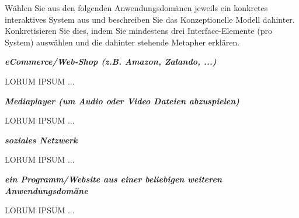 \documentclass[a4paper,10pt]{article}
\begin{document}
\kopf
\renewcommand{\figurename}{Figure}

Wählen Sie aus den folgenden Anwendungsdomänen jeweils ein konkretes interaktives System aus und beschreiben Sie das Konzeptionelle Modell dahinter. Konkretisieren Sie dies, indem Sie mindestens drei Interface-Elemente (pro System) auswählen und die dahinter stehende Metapher erklären. \newline
 
\textbf{\textit{eCommerce/Web-Shop (z.B. Amazon, Zalando, ...)}} \newline

LORUM IPSUM ... \newline

\textbf{\textit{Mediaplayer (um Audio oder Video Dateien abzuspielen)}} \newline

LORUM IPSUM ... \newline

\textbf{\textit{soziales Netzwerk}} \newline

LORUM IPSUM ... \newline

\textbf{\textit{ein Programm/Website aus einer beliebigen weiteren Anwendungsdomäne}} \newline

LORUM IPSUM ... \newline
\end{document}
